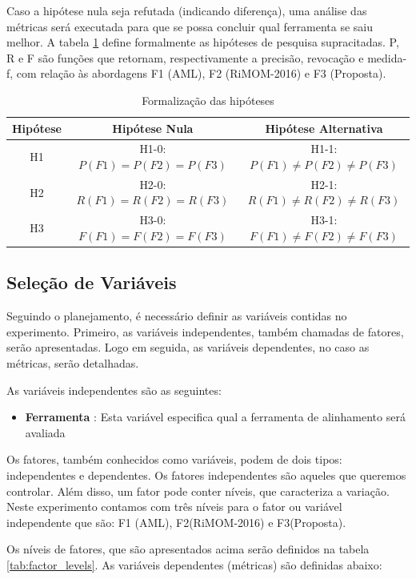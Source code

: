 Caso a hipótese nula seja refutada (indicando diferença), uma análise das métricas será executada para que se possa concluir qual ferramenta se saiu melhor.
A tabela \ref{tab:hypothesis} define formalmente as hipóteses de pesquisa supracitadas. P, R e F são funções que retornam, respectivamente a precisão, revocação e medida-f, com relação às abordagens F1 (AML), F2 (RiMOM-2016) e F3 (Proposta).

\begin{table}[h]
\centering
\caption{Formalização das hipóteses}
\label{tab:hypothesis}
\begin{tabular}{|c|c|c|}
\hline
Hipótese & Hipótese Nula & Hipótese Alternativa \\ \hline
H1       & H1-0:$ P(F1) = P(F2) = P(F3) $ & H1-1:$ P(F1) \not= P(F2) \not= P(F3) $                    \\ \hline
H2       & H2-0:$ R(F1) = R(F2) = R(F3) $ & H2-1:$ R(F1) \not= R(F2) \not= R(F3) $                    \\ \hline
H3       & H3-0:$ F(F1) = F(F2) = F(F3) $ & H3-1:$ F(F1) \not= F(F2) \not= F(F3) $                    \\ \hline
\end{tabular}
\end{table}

\subsection{Seleção de Variáveis}
Seguindo o planejamento, é necessário definir as variáveis contidas no experimento. Primeiro, as variáveis independentes, também chamadas de fatores, serão apresentadas. Logo em seguida, as variáveis dependentes, no caso as métricas, serão detalhadas.

As variáveis independentes são as seguintes:
\begin{itemize}
\item \textbf{Ferramenta} : Esta variável especifica qual a ferramenta de alinhamento será avaliada
\end{itemize}

Os fatores, também conhecidos como variáveis, podem de dois tipos: independentes e dependentes. Os fatores independentes são aqueles que queremos controlar. Além disso, um fator pode conter níveis, que caracteriza a variação. Neste experimento contamos com três níveis para o fator ou variável independente que são: F1 (AML), F2(RiMOM-2016) e F3(Proposta).

Os níveis de fatores, que são  apresentados acima serão definidos na tabela \ref{tab:factor_levels}. As variáveis dependentes (métricas) são definidas abaixo:

